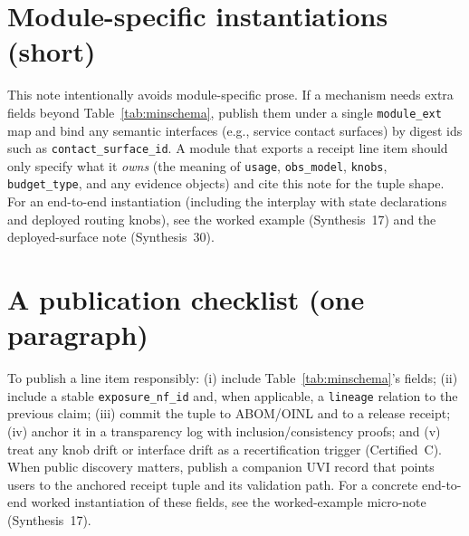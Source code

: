 \documentclass[11pt]{article}
\begin{document}
\section{Module-specific instantiations (short)}
This note intentionally avoids module-specific prose.
If a mechanism needs extra fields beyond Table~\ref{tab:minschema}, publish them under a single \texttt{module\_ext} map and bind any semantic interfaces (e.g., service contact surfaces) by digest ids such as \texttt{contact\_surface\_id}.
A module that exports a receipt line item should only specify what it \emph{owns} (the meaning of \texttt{usage}, \texttt{obs\_model}, \texttt{knobs}, \texttt{budget\_type}, and any evidence objects) and cite this note for the tuple shape.
For an end-to-end instantiation (including the interplay with state declarations and deployed routing knobs), see the worked example (Synthesis~17) and the deployed-surface note (Synthesis~30).\cite{series:workedexample,series:deployedsurfaces}\section{A publication checklist (one paragraph)}
To publish a line item responsibly:
(i) include Table~\ref{tab:minschema}'s fields;
(ii) include a stable \texttt{exposure\_nf\_id} and, when applicable, a \texttt{lineage} relation to the previous claim;
(iii) commit the tuple to ABOM/OINL and to a release receipt;\cite{series:abomoinl,series:releaseproperty}
(iv) anchor it in a transparency log with inclusion/consistency proofs;\cite{series:transparencyprimitives}
and (v) treat any knob drift or interface drift as a recertification trigger (Certified~C).\cite{series:recert}
When public discovery matters, publish a companion UVI record that points users to the anchored receipt tuple and its validation path.\cite{series:userminiface}
For a concrete end-to-end worked instantiation of these fields, see the worked-example micro-note (Synthesis~17).\cite{series:workedexample}
\end{document}
